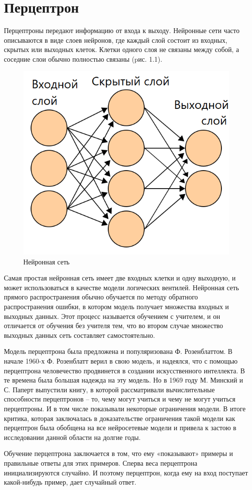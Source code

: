 \section{Перцептрон}

\indent \indent   
Перцептроны передают информацию от входа к выходу. Нейронные сети часто описываются в виде слоев нейронов, где каждый слой состоит из входных, скрытых или выходных клеток. Клетки одного слоя не связаны между собой, а соседние слои обычно полностью связаны (pис. 1.1). 

\begin{figure}[h]
  \centering
  \includegraphics[width=0.4\linewidth]{./img/neural-network}
  \caption{Нейронная сеть}
  \label{fig:mpr}
\end{figure} 

Самая простая нейронная сеть имеет две входных клетки и одну выходную, и может использоваться в качестве модели логических вентилей. Нейронная сеть прямого распространения обычно обучается по методу обратного распространения ошибки, в котором модель получает множества входных и выходных данных. Этот процесс называется обучением с учителем, и он отличается от обучения без учителя тем, что во втором случае множество выходных данных сеть составляет самостоятельно.

Модель перцептрона была предложена и популяризована Ф. Розенблаттом. В начале 1960-х Ф. Розенблатт верил в свою модель, и надеялся, что с помощью перцептрона человечество продвинется в создании искусственного интеллекта. В те времена была большая надежда на эту модель. Но в 1969 году М. Минский и С. Паперт выпустили книгу, в которой рассматривали вычислительные способности перцептронов – то, чему могут учиться и чему не могут учиться перцептроны. И в том числе показывали некоторые ограничения модели. В итоге критика, которая заключалась в доказательстве ограничения такой модели как перцептрон была обобщена на все нейросетевые модели и привела к застою в исследовании данной области на долгие годы.

Обучение перцептрона заключается в том, что ему «показывают» примеры и правильные ответы для этих примеров. Сперва веса перцептрона инициализируются случайно. И поэтому перцептрон, когда ему на вход поступает какой-нибудь пример, дает случайный ответ.


